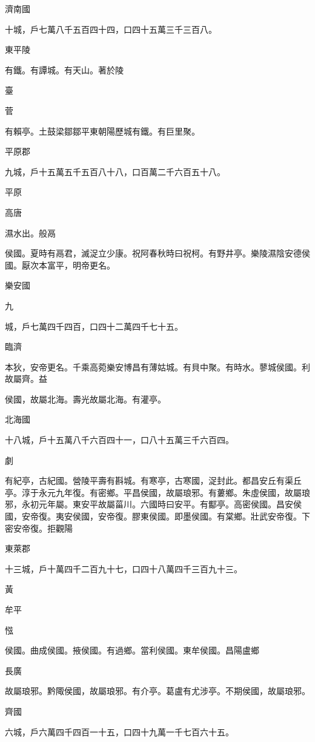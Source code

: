 
\begin{pinyinscope}
濟南國

十城，戶七萬八千五百四十四，口四十五萬三千三百八。

東平陵

有鐵。有譚城。有天山。著於陵

臺

菅

有賴亭。土鼓梁鄒鄒平東朝陽歷城有鐵。有巨里聚。

平原郡

九城，戶十五萬五千五百八十八，口百萬二千六百五十八。

平原

高唐

濕水出。般鬲

侯國。夏時有鬲君，滅浞立少康。祝阿春秋時曰祝柯。有野井亭。樂陵濕陰安德侯國。厭次本富平，明帝更名。

樂安國

九

城，戶七萬四千四百，口四十二萬四千七十五。

臨濟

本狄，安帝更名。千乘高菀樂安博昌有薄姑城。有貝中聚。有時水。蓼城侯國。利故屬齊。益

侯國，故屬北海。壽光故屬北海。有灌亭。

北海國

十八城，戶十五萬八千六百四十一，口八十五萬三千六百四。

劇

有紀亭，古紀國。營陵平壽有斟城。有寒亭，古寒國，浞封此。都昌安丘有渠丘亭。淳于永元九年復。有密鄉。平昌侯國，故屬琅邪。有蔞鄉。朱虛侯國，故屬琅邪，永初元年屬。東安平故屬菑川。六國時曰安平。有酅亭。高密侯國。昌安侯國，安帝復。夷安侯國，安帝復。膠東侯國。即墨侯國。有棠鄉。壯武安帝復。下密安帝復。拒觀陽

東萊郡

十三城，戶十萬四千二百九十七，口四十八萬四千三百九十三。

黃

牟平

惤

侯國。曲成侯國。掖侯國。有過鄉。當利侯國。東牟侯國。昌陽盧鄉

長廣

故屬琅邪。黔陬侯國，故屬琅邪。有介亭。葛盧有尤涉亭。不期侯國，故屬琅邪。

齊國

六城，戶六萬四千四百一十五，口四十九萬一千七百六十五。


\end{pinyinscope}
